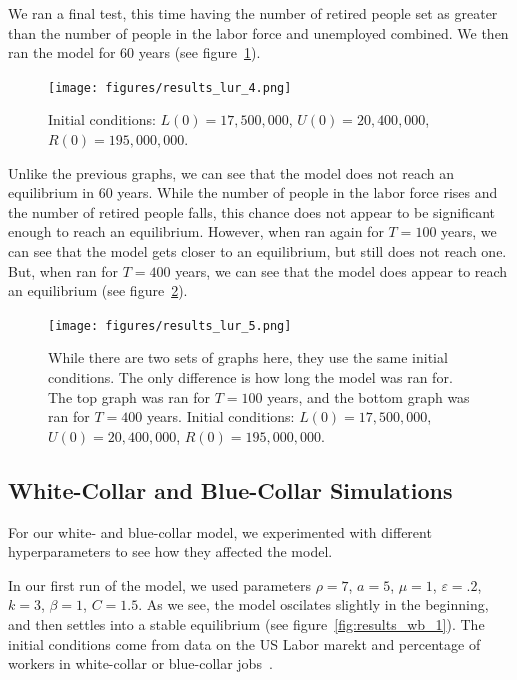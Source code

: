 \documentclass[11pt]{amsart}
\begin{document}
We ran a final test, this time having the number of retired people set as greater than the number of
people in the labor force and unemployed combined. We then ran the model for 60 years (see figure~\ref{fig:results_lur_4}).

\begin{figure}[h]
    \centering
    \texttt{[image: figures/results\_lur\_4.png]}
    \caption{Initial conditions: $L(0) = 17,500,000$, $U(0) = 20,400,000$, $R(0) = 195,000,000$.}
    \label{fig:results_lur_4}
\end{figure}

Unlike the previous graphs, we can see that the model does not reach an equilibrium in 60 years. 
While the number of people in the labor force rises and the number of retired people falls, 
this chance does not appear to be significant enough to reach an equilibrium. However,
when ran again for $T = 100$ years, we can see that the model gets closer to an equilibrium, but 
still does not reach one. But, when ran for $T = 400$ years, we can see that the model 
does appear to reach an equilibrium (see figure~\ref{fig:results_lur_5}).

\begin{figure}[h]
    \centering
    \texttt{[image: figures/results\_lur\_5.png]}
    \caption{While there are two sets of graphs here, they use the same initial conditions.
            The only difference is how long the model was ran for. The top graph was ran for $T = 100$ years, and 
            the bottom graph was ran for $T = 400$ years.
            Initial conditions: $L(0) = 17,500,000$, $U(0) = 20,400,000$, $R(0) = 195,000,000$.}
    \label{fig:results_lur_5}
\end{figure}

\subsection{White-Collar and Blue-Collar Simulations}

For our white- and blue-collar model, we experimented with different hyperparameters to see how they affected the model. 

In our first run of the model, we used parameters $\rho = 7$, $a = 5$, $\mu = 1$, $\varepsilon = .2$, $k = 3$, $\beta = 1$, $C = 1.5$. As we see, the model oscilates
slightly in the beginning, and then settles into a stable equilibrium (see figure~\ref{fig:results_wb_1}). The initial conditions come from data on the US Labor marekt and percentage of workers in white-collar or blue-collar jobs~\cite{BLS}.
\end{document}
